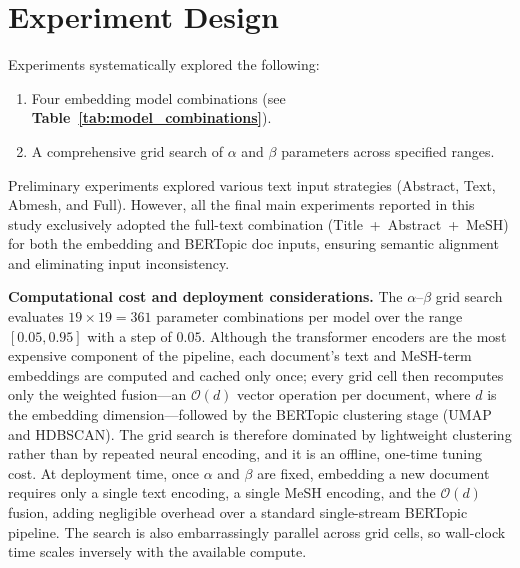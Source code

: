 \documentclass[authorproof,JACIII,researchpaper]{fujipressarticle}
\begin{document}
\section{Experiment Design}
Experiments systematically explored the following:
\begin{enumerate}[leftmargin=*,label=\arabic*)]
    \item Four embedding model combinations (see \textbf{Table~\ref{tab:model_combinations}}).
    \item A comprehensive grid search of $\alpha$ and $\beta$ parameters across specified ranges.
\end{enumerate}

Preliminary experiments explored various text input strategies (Abstract, Text, Abmesh, and Full). However, all the final main experiments reported in this study exclusively adopted the full-text combination (Title~+~Abstract~+~MeSH) for both the embedding and BERTopic doc inputs, ensuring semantic alignment and eliminating input inconsistency.

\noindent\textbf{Computational cost and deployment considerations.}
The $\alpha$--$\beta$ grid search evaluates $19 \times 19 = 361$ parameter combinations per model over the range $[0.05, 0.95]$ with a step of $0.05$. Although the transformer encoders are the most expensive component of the pipeline, each document's text and MeSH-term embeddings are computed and cached only once; every grid cell then recomputes only the weighted fusion---an $\mathcal{O}(d)$ vector operation per document, where $d$ is the embedding dimension---followed by the BERTopic clustering stage (UMAP and HDBSCAN). The grid search is therefore dominated by lightweight clustering rather than by repeated neural encoding, and it is an offline, one-time tuning cost. At deployment time, once $\alpha$ and $\beta$ are fixed, embedding a new document requires only a single text encoding, a single MeSH encoding, and the $\mathcal{O}(d)$ fusion, adding negligible overhead over a standard single-stream BERTopic pipeline. The search is also embarrassingly parallel across grid cells, so wall-clock time scales inversely with the available compute.
\end{document}
